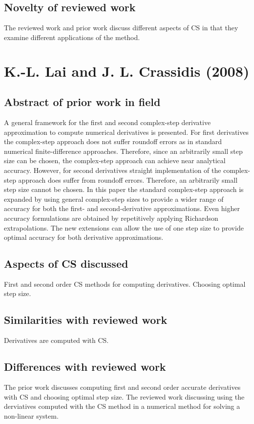 \documentclass[10pt,letterpaper,draft]{article}
\begin{document}
\subsection{Novelty of reviewed work}
The reviewed work and prior work discuss different aspects of CS in that they examine different
applications of the method.

\section{K.-L. Lai and J. L. Crassidis (2008)}
\subsection{Abstract of prior work in field}

A general framework for the first and second complex-step derivative
approximation to compute numerical derivatives is presented.  For first
derivatives the complex-step approach does not suffer roundoff errors as in
standard numerical finite-difference approaches.  Therefore, since an
arbitrarily small step size can be chosen, the complex-step approach can
achieve near analytical accuracy.  However, for second derivatives straight
implementation of the complex-step approach does suffer from roundoff errors.
Therefore, an arbitrarily small step size cannot be chosen. In this paper the
standard complex-step approach is expanded by using general complex-step sizes
to provide a wider range of accuracy for both the first- and second-derivative
approximations. Even higher accuracy formulations are obtained by repetitively
applying Richardson extrapolations. The new extensions can allow the use of one
step size to provide optimal accuracy for both derivative approximations.

\subsection{Aspects of CS discussed}
First and second order CS methods for computing derivatives. Choosing optimal
step size.

\subsection{Similarities with reviewed work}
Derivatives are computed with CS.

\subsection{Differences with reviewed work}
The prior work discusses computing first and second order accurate derivatives with CS and choosing optimal step size.
The reviewed work discussing using the derviatives computed with the CS method in a numerical method for solving 
a non-linear system.
\end{document}
